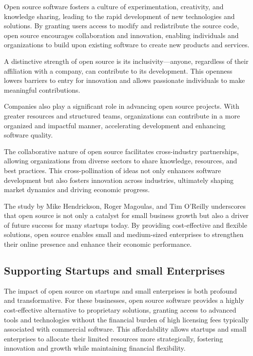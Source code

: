 
Open source software fosters a culture of experimentation, creativity, and knowledge sharing, 
leading to the rapid development of new technologies and solutions. By granting users access to modify and redistribute the source code, 
open source encourages collaboration and innovation, 
enabling individuals and organizations to build upon existing software to create new products and services.

A distinctive strength of open source is its inclusivity—anyone, regardless of their affiliation with a company,
can contribute to its development. 
This openness lowers barriers to entry for innovation and allows passionate individuals to make meaningful contributions.

Companies also play a significant role in advancing open source projects. 
With greater resources and structured teams, organizations can contribute in a more organized and impactful manner, 
accelerating development and enhancing software quality.

The collaborative nature of open source facilitates cross-industry partnerships, 
allowing organizations from diverse sectors to share knowledge, resources, and best practices. 
This cross-pollination of ideas not only enhances software development but also fosters innovation across industries, 
ultimately shaping market dynamics and driving economic progress.

The study \cite{opensource_hendrickson2012economic} by Mike Hendrickson, Roger Magoulas, 
and Tim O'Reilly underscores that open source is not only a catalyst for small business growth but also a driver of future success for many startups today. 
By providing cost-effective and flexible solutions,
open source enables small and medium-sized enterprises to strengthen their online presence and enhance their economic performance.


\subsection{Supporting Startups and small Enterprises}

The impact of open source on startups and small enterprises is both profound and transformative. 
For these businesses, open source software provides a highly cost-effective alternative to proprietary solutions, 
granting access to advanced tools and technologies without the financial burden of high licensing fees typically associated with commercial software. 
This affordability allows startups and small enterprises to allocate their limited resources more strategically,
fostering innovation and growth while maintaining financial flexibility.

